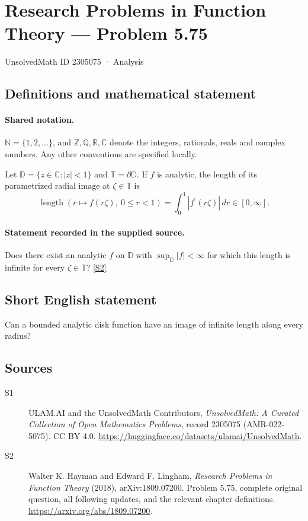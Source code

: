 \documentclass[11pt]{book}
\newcommand{\sref}[2]{\hyperlink{source:#1:#2}{[S#2]}}
\begin{document}
\setcounter{section}{2305074}
\section{Research Problems in Function Theory — Problem 5.75}\label{2305075}
{\small\sffamily UnsolvedMath ID 2305075 · Analysis}
\subsection{Definitions and mathematical statement}

\paragraph{Shared notation.}$\mathbb N=\{1,2,\ldots\}$, and $\mathbb Z,\mathbb Q,\mathbb R,\mathbb C$ denote the integers, rationals, reals and complex numbers. Any other conventions are specified locally.


Let $\mathbb D=\{z\in\mathbb C:|z|<1\}$ and $\mathbb T=\partial\mathbb D$. If $f$ is analytic, the length of its parametrized radial image at $\zeta\in\mathbb T$ is \[\operatorname{length}(r\mapsto f(r\zeta),\ 0\le r<1)=\int_0^1|f^{\prime}(r\zeta)|\,dr\in[0,\infty].\]
\paragraph{Statement recorded in the supplied source.}
Does there exist an analytic $f$ on $\mathbb D$ with $\sup_{\mathbb D}|f|<\infty$ for which this length is infinite for every $\zeta\in\mathbb T$? \sref{2305075}{2}
\subsection{Short English statement}
Can a bounded analytic disk function have an image of infinite length along every radius?
\subsection{Sources}
\begin{description}
\item[\hypertarget{source:2305075:1}{S1}] ULAM.AI and the UnsolvedMath Contributors, \emph{UnsolvedMath: A Curated Collection of Open Mathematics Problems}, record 2305075 (AMR-022-5075). CC BY 4.0. \url{https://huggingface.co/datasets/ulamai/UnsolvedMath}.
\item[\hypertarget{source:2305075:2}{S2}] Walter K. Hayman and Edward F. Lingham, \emph{Research Problems in Function Theory} (2018), arXiv:1809.07200. Problem 5.75, complete original question, all following updates, and the relevant chapter definitions. \url{https://arxiv.org/abs/1809.07200}.
\end{description}
\label{end:2305075}
\end{document}

